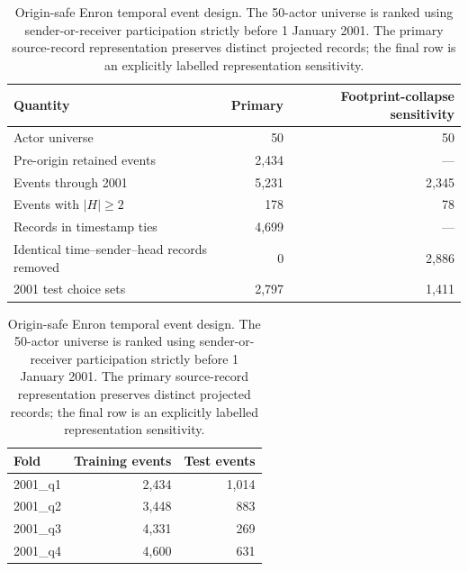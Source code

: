 \begin{table}[t]
\centering
\caption{Origin-safe Enron temporal event design. The 50-actor universe is ranked using sender-or-receiver participation strictly before 1 January 2001. The primary source-record representation preserves distinct projected records; the final row is an explicitly labelled representation sensitivity.}
\label{tab:design}
\small
\begin{tabular}{lrr}
\toprule
Quantity & Primary & Footprint-collapse sensitivity \\
\midrule
Actor universe & 50 & 50 \\
Pre-origin retained events & 2,434 & --- \\
Events through 2001 & 5,231 & 2,345 \\
Events with $|H|\geq2$ & 178 & 78 \\
Records in timestamp ties & 4,699 & --- \\
Identical time--sender--head records removed & 0 & 2,886 \\
2001 test choice sets & 2,797 & 1,411 \\
\bottomrule
\end{tabular}

\vspace{0.6em}
\begin{tabular}{lrr}
\toprule
Fold & Training events & Test events \\
\midrule
2001\_q1 & 2,434 & 1,014 \\
2001\_q2 & 3,448 & 883 \\
2001\_q3 & 4,331 & 269 \\
2001\_q4 & 4,600 & 631 \\
\bottomrule
\end{tabular}
\end{table}
